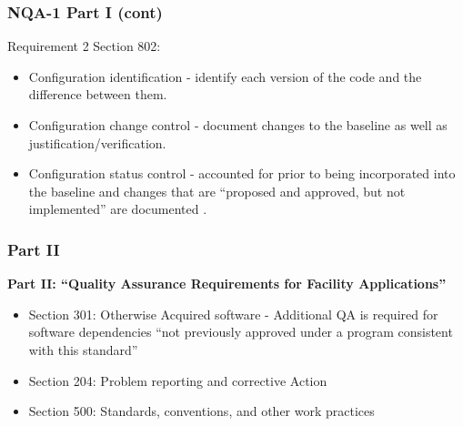 \documentclass[12pt]{beamer}
\begin{document}
\begin{frame}
\frametitle{NQA-1 Part I (cont)}

Requirement 2 Section 802:
\begin{itemize}
\item{\alert{Configuration identification} - identify each version of the code and the difference between them.}
\item{\alert{Configuration change control} - document changes to the baseline as well as justification/verification.}
\item{\alert{Configuration status control} - accounted for prior to being incorporated into the baseline and changes that are “proposed and approved, but not implemented” are documented \cite{add}.}
\end{itemize}
\end{frame}
\begin{frame}
\frametitle{Part II}

{\bf Part II: ``Quality Assurance Requirements for Facility Applications''}

\begin{itemize}
\item{Section 301: \alert{Otherwise Acquired software} - Additional QA is required for software dependencies ``not previously approved under a program consistent with this standard''}
\item{Section 204: \alert{Problem reporting} and \alert{corrective Action}}
\item{Section 500: \alert{Standards}, \alert{conventions}, and other \alert{work practices}}
\end{itemize}


\end{frame}

\end{document}
